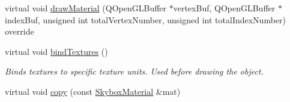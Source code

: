 \begin{DoxyCompactItemize}
\item 
virtual void \mbox{\hyperlink{class_geometry_engine_1_1_geometry_material_1_1_skybox_material_a0cc520b905996a178c80a2657bc9746f}{draw\+Material}} (Q\+Open\+G\+L\+Buffer $\ast$vertex\+Buf, Q\+Open\+G\+L\+Buffer $\ast$index\+Buf, unsigned int total\+Vertex\+Number, unsigned int total\+Index\+Number) override
\item 
\mbox{\label{class_geometry_engine_1_1_geometry_material_1_1_skybox_material_a04ca59e198af1cd358a2f876df876adb}} 
virtual void \mbox{\hyperlink{class_geometry_engine_1_1_geometry_material_1_1_skybox_material_a04ca59e198af1cd358a2f876df876adb}{bind\+Textures}} ()
\begin{DoxyCompactList}\small\item\em Binds textures to specific texture units. Used before drawing the object. \end{DoxyCompactList}\item 
virtual void \mbox{\hyperlink{class_geometry_engine_1_1_geometry_material_1_1_skybox_material_afcb8bf256fbb2927e2030fbe8a631af0}{copy}} (const \mbox{\hyperlink{class_geometry_engine_1_1_geometry_material_1_1_skybox_material}{Skybox\+Material}} \&mat)
\end{DoxyCompactItemize}
